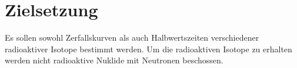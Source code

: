 
\section{Zielsetzung}
\label{sec:Zielsetzung}
Es sollen sowohl Zerfallskurven als auch Halbwertszeiten verschiedener radioaktiver Isotope bestimmt werden. Um die 
radioaktiven Isotope zu erhalten werden nicht radioaktive Nuklide mit Neutronen beschossen. 
